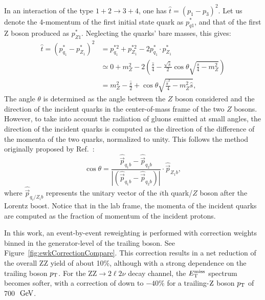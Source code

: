 In an interaction of the type $1+2 \rightarrow 3 + 4$, 
one has $\hat{t} = \left( p_1 - p_3 \right)^2$. 
Let us denote the 4-momentum of the first initial state quark as $p^*_{q1}$,
and that of the first Z boson produced as $p^*_{Z1}$.
Neglecting the quarks' bare masses, this gives:
\begin{equation}
\begin{split}
\hat{t} = \left(p^*_{q_1}-p^*_{Z_1}\right)^2 & = p_{q_1}^{*2} +
p_{Z_1}^{*2} - 2 p^*_{q_1} \cdot p^*_{Z_1} \\
& \simeq 0 + m_{Z}^{2} - 2 \left( \frac{\hat{s}}{4} -
\frac{\sqrt{\hat{s}}}{2} \cos{\theta} \sqrt{\frac{\hat{s}}{4} -
m_{Z}^{2}} \right) \\
& = m_{Z}^{2} - \frac{\hat{s}}{2} + \cos{\theta}
\sqrt{\frac{\hat{s}^2}{4} - m_{Z}^{2}\hat{s}},
\end{split}
\end{equation}
The angle $\theta$ is determined as the angle between the $Z$ boson considered
and the direction of the incident quarks in the center-of-mass frame of the two $Z$ bosons.
However, to take into account the radiation of gluons emitted at small angles, 
the direction of the incident quarks is computed as the direction of the difference of the momenta of the two quarks, normalized to
unity. This follows the method originally proposed by Ref.~\cite{Gieseke:2014gka}:
\begin{equation}
\cos{\theta} = \frac{\hat{\vec{p}}_{q_1b} -
\hat{\vec{p}}_{q_2b}}{\left|\left( \hat{\vec{p}}_{q_1b} -
\hat{\vec{p}}_{q_2b} \right)\right|} \cdot \hat{\vec{p}}_{Z_1b},
\end{equation}
where $\hat{\vec{p}}_{q_i/Z_ib}$ represents the unitary vector of the
$i$th quark/$Z$ boson after the Lorentz boost. Notice that in the
lab frame, the momenta of the incident quarks are computed as the
fraction of momentum of the incident protons.

In this work, an event-by-event reweighting is performed with correction weights
binned in the generator-level \pt of the trailing boson. See Figure~\ref{fig:ewkCorrectionCompare}.
This correction results in a net reduction of the overall ZZ yield of about 10\%,
although with a strong dependence on the trailing boson $p_{\mathrm{T}}$.
For the $\mathrm{ZZ}\rightarrow 2\ell 2 \nu$ decay channel, the $E_\mathrm{T}^{\mathrm{miss}}$ spectrum becomes softer,
with a correction of down to $-40\%$ for a trailing-$\mathrm{Z}$ boson $p_{\mathrm{T}}$ of 700~$\,\text{Ge\hspace{-.08em}V}$. 

